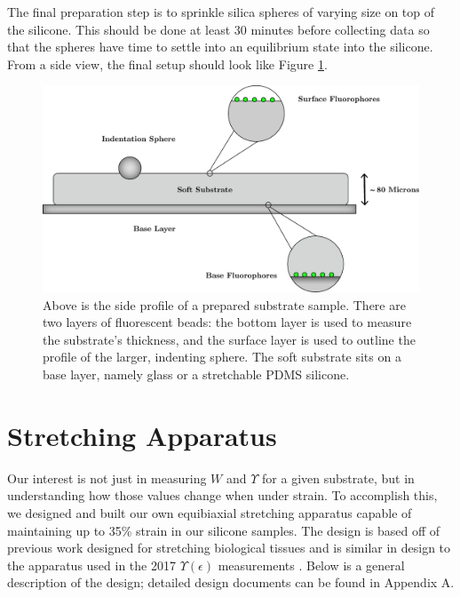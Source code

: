 The final preparation step is to sprinkle silica spheres of varying size on top of the silicone. This should be done at least 30 minutes before collecting data so that the spheres have time to settle into an equilibrium state into the silicone. From a side view, the final setup should look like Figure \ref{fig:substrategraphic}.
\begin{figure}[h!]
	\centering
	\includegraphics[width=.85\linewidth]{Chapters/Figures/substrate_graphic_new}
	\caption[Prepared Substrate Profile]{Above is the side profile of a prepared substrate sample. There are two layers of fluorescent beads: the bottom layer is used to measure the substrate's thickness, and the surface layer is used to outline the profile of the larger, indenting sphere. The soft substrate sits on a base layer, namely glass or a stretchable PDMS silicone.}
	\label{fig:substrategraphic}
\end{figure}


\section{Stretching Apparatus}
Our interest is not just in  measuring $W$ and $\Upsilon$ for a given substrate, but in understanding how those values change when under strain. To accomplish this, we designed and built our own equibiaxial stretching apparatus capable of maintaining up to 35\% strain in our silicone samples. The design is based off of previous work designed for stretching biological tissues \cite{na2008time} and is similar in design to the apparatus used in the 2017 $\Upsilon(\epsilon)$ measurements \cite{xu2017direct}. Below is a general description of the design; detailed design documents can be found in Appendix A.

